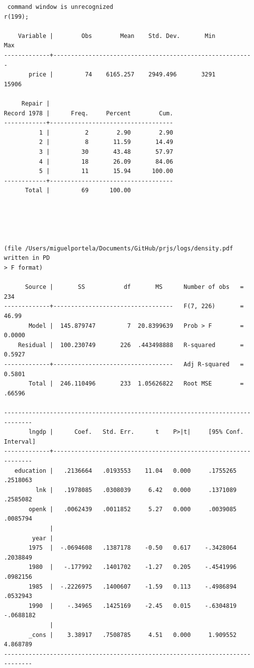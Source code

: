 \documentclass[
  12pt,
]{article}
\begin{document}
\begin{verbatim}
 command window is unrecognized
r(199);

    Variable |        Obs        Mean    Std. Dev.       Min        Max
-------------+---------------------------------------------------------
       price |         74    6165.257    2949.496       3291      15906

     Repair |
Record 1978 |      Freq.     Percent        Cum.
------------+-----------------------------------
          1 |          2        2.90        2.90
          2 |          8       11.59       14.49
          3 |         30       43.48       57.97
          4 |         18       26.09       84.06
          5 |         11       15.94      100.00
------------+-----------------------------------
      Total |         69      100.00





(file /Users/miguelportela/Documents/GitHub/prjs/logs/density.pdf written in PD
> F format)

      Source |       SS           df       MS      Number of obs   =       234
-------------+----------------------------------   F(7, 226)       =     46.99
       Model |  145.879747         7  20.8399639   Prob > F        =    0.0000
    Residual |  100.230749       226  .443498888   R-squared       =    0.5927
-------------+----------------------------------   Adj R-squared   =    0.5801
       Total |  246.110496       233  1.05626822   Root MSE        =    .66596

------------------------------------------------------------------------------
       lngdp |      Coef.   Std. Err.      t    P>|t|     [95% Conf. Interval]
-------------+----------------------------------------------------------------
   education |   .2136664   .0193553    11.04   0.000     .1755265    .2518063
         lnk |   .1978085   .0308039     6.42   0.000     .1371089    .2585082
       openk |   .0062439   .0011852     5.27   0.000     .0039085    .0085794
             |
        year |
       1975  |  -.0694608   .1387178    -0.50   0.617    -.3428064    .2038849
       1980  |   -.177992   .1401702    -1.27   0.205    -.4541996    .0982156
       1985  |  -.2226975   .1400607    -1.59   0.113    -.4986894    .0532943
       1990  |    -.34965   .1425169    -2.45   0.015    -.6304819   -.0688182
             |
       _cons |    3.38917   .7508785     4.51   0.000     1.909552    4.868789
------------------------------------------------------------------------------
\end{verbatim}
\end{document}
